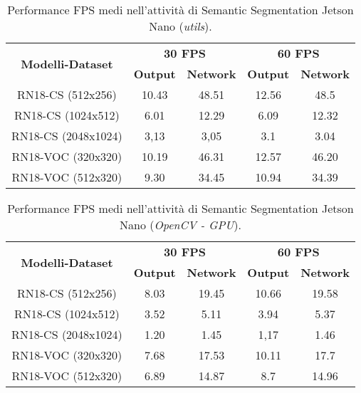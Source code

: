 \begin{table}
    \renewcommand{\baselinestretch}{1}
    \centering
    \begin{adjustbox}{max width=\textwidth}
    \begin{tabular}{|c||c|c||c|c||}
        \hline
        \multirow{2}{*}{\bfseries{\Large Modelli-Dataset}} & \multicolumn{2}{c||}{\bfseries{30 FPS}} & \multicolumn{2}{c||}{\bfseries{60 FPS}}\\            & \bfseries{Output} & \bfseries{Network} & \bfseries{Output} & \bfseries{Network}\\
        \hline
        \hline
        RN18-CS (512x256) & 10.43 & 48.51 & 12.56 & 48.5\\
        \hline
        RN18-CS (1024x512) & 6.01 & 12.29 & 6.09 & 12.32\\
        \hline 
        RN18-CS (2048x1024) & 3,13 & 3,05 & 3.1 & 3.04\\
        \hline
        RN18-VOC (320x320) & 10.19 &  46.31 & 12.57 & 46.20\\
        \hline
        RN18-VOC (512x320) & 9.30 & 34.45 & 10.94 & 34.39\\
        \hline
    \end{tabular}
    \end{adjustbox}
    \vspace{0.5cm}
    \caption{Performance FPS medi nell'attività di Semantic Segmentation Jetson Nano (\emph{utils}).}
    \label{average performance jetson utils sem_seg}
\end{table}

\begin{table}
    \renewcommand{\baselinestretch}{1}
    \centering
    \begin{adjustbox}{max width=\textwidth}
    \begin{tabular}{|c||c|c||c|c||}
        \hline
        \multirow{2}{*}{\bfseries{\Large Modelli-Dataset}} & \multicolumn{2}{c||}{\bfseries{30 FPS}} & \multicolumn{2}{c||}{\bfseries{60 FPS}}\\            & \bfseries{Output} & \bfseries{Network} & \bfseries{Output} & \bfseries{Network}\\
        \hline
        \hline
        RN18-CS (512x256) & 8.03 & 19.45 & 10.66 & 19.58\\
        \hline
        RN18-CS (1024x512) & 3.52 & 5.11 & 3.94 & 5.37\\
        \hline 
        RN18-CS (2048x1024) & 1.20 & 1.45 & 1,17 & 1.46\\
        \hline
        RN18-VOC (320x320) & 7.68 &  17.53 & 10.11 & 17.7\\
        \hline
        RN18-VOC (512x320) & 6.89 & 14.87 & 8.7 & 14.96\\
        \hline
    \end{tabular}
    \end{adjustbox}
    \vspace{0.5cm}
    \caption{Performance FPS medi nell'attività di Semantic Segmentation Jetson Nano (\emph{OpenCV - GPU}).}
    \label{average performance jetson opencv GPU sem_seg}
\end{table}

